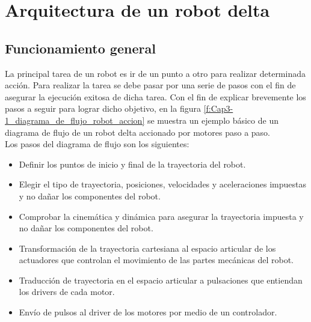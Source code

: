 \chapter{Arquitectura de un robot delta}\label{CAP3}

\section{Funcionamiento general}

La principal tarea de un robot es ir de un punto a otro para realizar determinada acción. Para realizar la tarea se debe pasar por una serie de pasos con el fin de asegurar la ejecución exitosa de dicha tarea. Con el fin de explicar brevemente los pasos a seguir para lograr dicho objetivo, en la figura \ref{f:Cap3-1_diagrama_de_flujo_robot_accion} se muestra un ejemplo básico de un diagrama de flujo de un robot delta accionado por motores paso a paso.\\

Los pasos del diagrama de flujo son los siguientes:

\begin{itemize}
    \item Definir los puntos de inicio y final de la trayectoria del robot.
    \item Elegir el tipo de trayectoria, posiciones, velocidades y aceleraciones impuestas y no dañar los componentes del robot.
    \item Comprobar la cinemática y dinámica para asegurar la trayectoria impuesta y no dañar los componentes del robot.
    \item Transformación de la trayectoria cartesiana al espacio articular de los actuadores que controlan el movimiento de las partes mecánicas del robot.
    \item Traducción de trayectoria en el espacio articular a pulsaciones que entiendan los drivers de cada motor.
    \item Envío de pulsos al driver de los motores por medio de un controlador.
\end{itemize}

        \newpage

